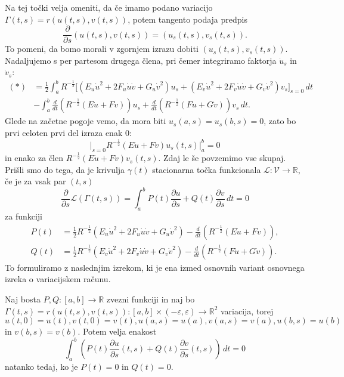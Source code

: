 Na tej točki velja omeniti, da če imamo podano variacijo $\Gamma(t,s) = r(u(t,s), v(t,s))$, potem tangento podaja predpis \begin{equation*}
\frac{ \partial  }{ \partial s } (u(t,s), v(t,s)) = (u_s(t,s), v_s(t,s)).
\end{equation*}  
To pomeni, da bomo morali v zgornjem izrazu dobiti $(u_s(t,s), v_s(t,s))$. Nadaljujemo s per partesom drugega člena, pri čemer integriramo faktorja $\dot{u}_s$ in $\dot{v}_s$: \begin{align*}
    (*) &= \frac{1}{2} \int_{a}^{b}  R^{-\frac{1}{2}} \bigg[ (E_u \dot{u}^2 + 2F_u \dot{u} \dot{v} + G_u \dot{v}^2) u_s + (E_v \dot{u}^2 + 2F_v \dot{u} \dot{v} + G_v \dot{v}^2)v_s \bigg]_{s = 0} \, dt \\
    &- \int_{a}^{b} \frac{ d  }{ dt } \left( R^{-\frac{1}{2}} (E\dot{u} + F\dot{v}) \right) u_s  + \frac{ d }{ dt } \left( R^{-\frac{1}{2}} (F\dot{u} + G\dot{v}) \right) v_s \, dt.
\end{align*}
Glede na začetne pogoje vemo, da mora biti $u_s(a,s) = u_s(b,s) = 0$, zato bo prvi celoten prvi del izraza enak 0: \begin{equation*}
\bigg|_{s = 0} R^{-\frac{1}{2}} (E\dot{u} + F\dot{v}) u_s(t,s) \bigg|_a^{b} = 0
\end{equation*}  
in enako za člen $R^{-\frac{1}{2}} (E\dot{u} + F\dot{v}) v_s(t,s)$. Zdaj le še povzemimo vse skupaj.
Prišli smo do tega, da je krivulja $\gamma(t)$ stacionarna točka funkcionala $\mathcal{L}: \mathcal{V} \to  \mathbb{R}$, če je za vsak par $(t,s)$\begin{equation*}
\frac{ \partial  }{ \partial s } \mathcal{L}(\Gamma(t,s)) = \int_{a}^{b} P(t) \frac{ \partial u }{ \partial s } + Q(t) \frac{ \partial v }{ \partial s }  \, dt  = 0  
\end{equation*}
za funkciji \begin{align*}
    P(t) &= \frac{1}{2} R^{-\frac{1}{2}} (E_u \dot{u}^2 + 2F_u \dot{u} \dot{v} + G_u \dot{v}^2) - \frac{d}{dt} (R^{-\frac{1}{2}}(E\dot{u} + F\dot{v})), \\
    Q(t) &= \frac{1}{2} R^{-\frac{1}{2}} (E_v \dot{u}^2 + 2F_v \dot{u} \dot{v} + G_v \dot{v}^2) - \frac{d}{dt} (R^{-\frac{1}{2}}(F\dot{u} + G\dot{v})).
\end{align*}
To formuliramo z naslednjim izrekom, ki je ena izmed osnovnih variant osnovnega izreka o variacijskem računu.

\begin{izrek}
\label{izr_osnovni_izrek_o_variacijskem_racunu}
Naj bosta $P, Q: [a,b] \to  \mathbb{R}$ zvezni funkciji in naj bo $\Gamma(t, s) = r(u(t,s), v(t,s)) : [a,b] \times (-\varepsilon, \varepsilon) \to \mathbb{R}^2$ variacija, torej $u(t, 0) = u(t), v(t, 0) = v(t), u(a,s) = u(a), v(a,s) = v(a), u(b,s) = u(b)$ in $v(b,s) = v(b)$. Potem velja enakost \begin{equation*}
 \int_{a}^{b}  \left( P(t) \frac{ \partial u }{ \partial s }(t, s)  + Q(t) \frac{ \partial v }{ \partial s }(t, s) \right)  \, dt = 0 
 \end{equation*}  
natanko tedaj, ko je $P(t) = 0$ in $Q(t) = 0$.
\end{izrek}

